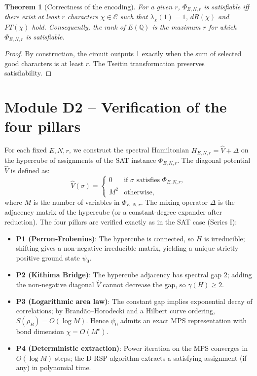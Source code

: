 \documentclass[11pt,a4paper]{article}
\newtheorem{theorem}{Theorem}[section]
\begin{document}
\begin{theorem}[Correctness of the encoding]
For a given \(r\), \(\Phi_{E,N,r}\) is satisfiable iff there exist at least \(r\) characters \(\chi \in \mathcal{C}\) such that \(\lambda_\chi(1)=1\), \(dR(\chi)\) and \(PT(\chi)\) hold. Consequently, the rank of \(E(\mathbb{Q})\) is the maximum \(r\) for which \(\Phi_{E,N,r}\) is satisfiable.
\end{theorem}
\begin{proof}
By construction, the circuit outputs 1 exactly when the sum of selected good characters is at least \(r\). The Tseitin transformation preserves satisfiability.
\end{proof}

\section{Module D2 – Verification of the four pillars}

For each fixed \(E,N,r\), we construct the spectral Hamiltonian \(H_{E,N,r} = \hat{V} + \Delta\) on the hypercube of assignments of the SAT instance \(\Phi_{E,N,r}\). The diagonal potential \(\hat{V}\) is defined as:
\[
\hat{V}(\sigma) = \begin{cases}
0 & \text{if }\sigma\text{ satisfies }\Phi_{E,N,r},\\
M^2 & \text{otherwise},
\end{cases}
\]
where \(M\) is the number of variables in \(\Phi_{E,N,r}\). The mixing operator \(\Delta\) is the adjacency matrix of the hypercube (or a constant‑degree expander after reduction). The four pillars are verified exactly as in the SAT case (Series I):

\begin{itemize}
\item \textbf{P1 (Perron‑Frobenius)}: The hypercube is connected, so \(H\) is irreducible; shifting gives a non‑negative irreducible matrix, yielding a unique strictly positive ground state \(\psi_0\).
\item \textbf{P2 (Kithima Bridge)}: The hypercube adjacency has spectral gap \(2\); adding the non‑negative diagonal \(\hat{V}\) cannot decrease the gap, so \(\gamma(H) \ge 2\).
\item \textbf{P3 (Logarithmic area law)}: The constant gap implies exponential decay of correlations; by Brandão–Horodecki and a Hilbert curve ordering, \(S(\rho_B) = O(\log M)\). Hence \(\psi_0\) admits an exact MPS representation with bond dimension \(\chi = O(M^c)\).
\item \textbf{P4 (Deterministic extraction)}: Power iteration on the MPS converges in \(O(\log M)\) steps; the D‑RSP algorithm extracts a satisfying assignment (if any) in polynomial time.
\end{itemize}
\end{document}
